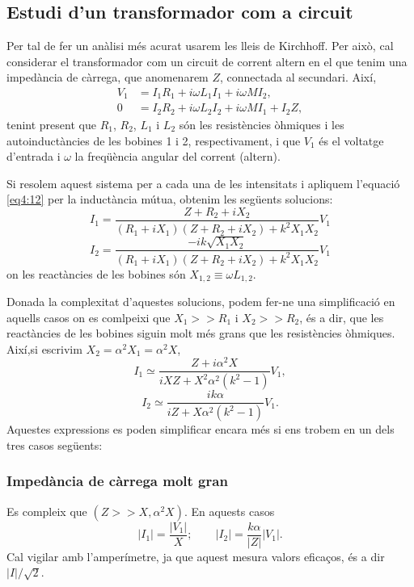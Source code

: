 \documentclass[a4paper,10.5pt]{report}
\begin{document}
\subsection{Estudi d'un transformador com a circuit}
Per tal de fer un anàlisi més acurat usarem les lleis de Kirchhoff. Per això, cal considerar el transformador com un circuit de corrent altern en el que tenim una impedància de càrrega, que anomenarem $Z$, connectada al secundari. Així,
\begin{align}
	V_1 &= I_1 R_1 + i \omega L_1 I_1 + i \omega M I_2 \label{eq4:13},\\
	0 & = I_2 R_2 + i \omega L_2 I_2 + i \omega M I_1 + I_2 Z \label{eq4:14},
\end{align}
tenint present que $R_1$, $R_2$, $L_1$ i $L_2$ són les resistències òhmiques i les autoinductàncies de les bobines 1 i 2, respectivament, i que $V_1$ és el voltatge d'entrada i $\omega$ la freqüència angular del corrent (altern).

Si resolem aquest sistema per a cada una de les intensitats i apliquem l'equació \eqref{eq4:12} per la inductància mútua, obtenim les següents solucions:
\begin{equation}
	I_1 = \frac{Z + R_2 + iX_2}{(R_1 + iX_1)(Z + R_2 + iX_2) + k^2 X_1 X_2} V_1 \label{eq4:15}
\end{equation}
\begin{equation}
	I_2 = \frac{-ik\sqrt{X_1 X_2}}{(R_1 + iX_1)(Z + R_2 + iX_2) + k^2 X_1 X_2} V_1 \label{eq4:16}
\end{equation}
on les reactàncies de les bobines són $X_{1,2} \equiv \omega L_{1,2}$.

Donada la complexitat d'aquestes solucions, podem fer-ne una simplificació en aquells casos on es comlpeixi que $X_1 >> R_1$ i $X_2 >> R_2$, és a dir, que les reactàncies de les bobines siguin molt més grans que les resistències òhmiques. Així,si escrivim $X_2 = \alpha^2 X_1 = \alpha^2 X$,
\begin{equation}
	I_1 \simeq \frac{Z + i\alpha^2 X}{iX Z + X^2 \alpha^2 (k^2 - 1)} V_1, \label{eq4:17}
\end{equation}
\begin{equation}
	I_2 \simeq \frac{i k \alpha}{iZ + X \alpha^2 (k^2 - 1)} V_1. \label{eq4:18}
\end{equation}
Aquestes expressions es poden simplificar encara més si ens trobem en un dels tres casos següents:
\subsubsection{Impedància de càrrega molt gran}
Es compleix que $(Z >> X,\alpha^2X)$. En aquests casos
\begin{equation}
	|I_1| =  \frac{|V_1|}{X}  ; \qquad |I_2| = \frac{k \alpha}{|Z|} |V_1|.
	\label{eq4:19}
\end{equation}
Cal vigilar amb l'amperímetre, ja que aquest mesura valors eficaços, és a dir $|I|/\sqrt{2}$.
\end{document}
